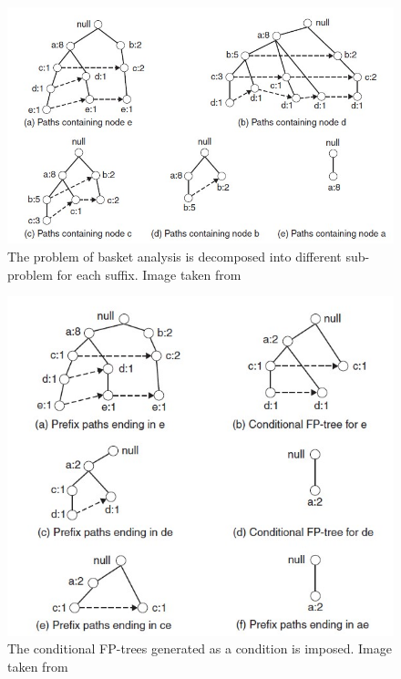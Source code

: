 \documentclass[12pt,%
               a4paper,%
               oneside,openany,%
               titlepage,%
               headinclude,footinclude,%
               BCOR5mm,%
               cleardoublepage=empty,%
               tablecaptionabove,%
               floatperchapter,
               ]{scrreprt}                 %
\begin{document}
\begin{figure}
\begin{center}
\includegraphics[width=\textwidth]{Figures/FP_gen_1.jpg}
\caption{The problem of basket analysis is decomposed into different sub-problem for each suffix. Image taken from \cite{tan2019introduction} }
\label{FP_gen_1}
\end{center}
\end{figure}

\begin{figure}
\begin{center}
\includegraphics[width=\textwidth]{Figures/FP_gen_2.jpg}
\caption{The conditional FP-trees generated as a condition is imposed. Image taken from \cite{tan2019introduction} }
\label{FP_gen_2}
\end{center}
\end{figure}
\end{document}
